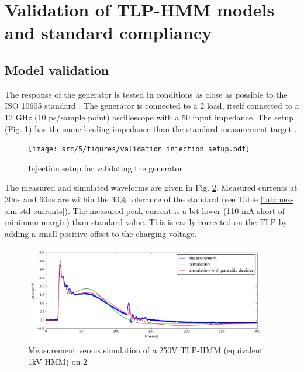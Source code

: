 \section{Validation of TLP-HMM models and standard compliancy}

\subsection{Model validation}

The response of the generator is tested in conditions as close as possible to the ISO 10605 standard \cite{iso10605}.
The generator is connected to a 2\textOmega{} load, itself connected to a 12 GHz (10 ps/sample point) oscilloscope with a 50\textOmega{} input impedance.
The setup (Fig. \ref{fig:injection_setup_validation}) has the same loading impedance than the standard measurement target \cite{iso10605, iec61000-4-2}.

\begin{figure}[!h]
  \centering
  \texttt{[image: src/5/figures/validation\_injection\_setup.pdf]}
  \caption{Injection setup for validating the generator}
  \label{fig:injection_setup_validation}
\end{figure}

The measured and simulated waveforms are given in Fig. \ref{fig:tlp_hmm_waveforms}.
Measured currents at 30ns and 60ns are within the 30\% tolerance of the standard (see Table \ref{tab:mes-sim-std-currents}).
The measured peak current is a bit lower (110 mA short of minimum margin) than standard value.
This is easily corrected on the TLP by adding a small positive offset to the charging voltage.

\begin{figure}[!h]
  \centering
  \includegraphics[width=0.95\textwidth]{src/5/figures/tlp_hmm_waveforms.png}
  \caption{Measurement versus simulation of a 250V TLP-HMM (equivalent 1kV HMM) on 2\textOmega{}}
  \label{fig:tlp_hmm_waveforms}
\end{figure}

